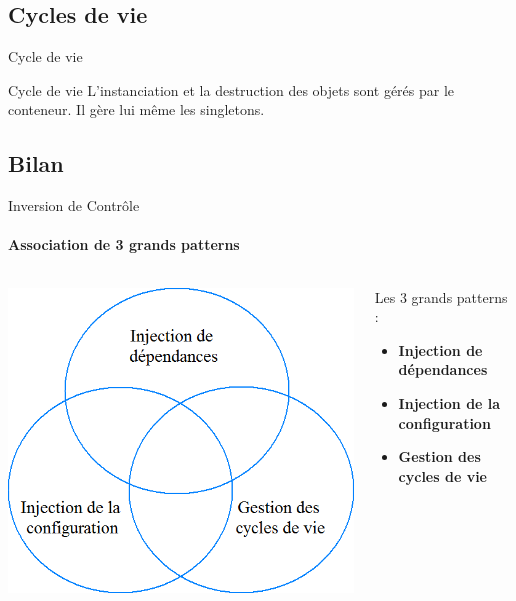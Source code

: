 \documentclass[compress]{beamer}%
\begin{document}
\subsection{Cycles de vie}

\begin{frame}{Cycle de vie}

	\begin{block}{Cycle de vie}
	L'instanciation et la destruction des objets sont gérés par le conteneur. Il gère lui même les singletons.
	\end{block}

\end{frame}

\subsection{Bilan}

\begin{frame}{Inversion de Contrôle}
	\framesubtitle{Association de 3 grands patterns}
	
	\begin{columns}
		\begin{column}{0.5\textwidth}
			\includegraphics[width=\textwidth]{images/spring_ioc.png}
		\end{column}
		\begin{column}{0.5\textwidth}
			Les 3 grands patterns :
			\begin{itemize}
			\item \textbf{Injection de dépendances}	
			\item \textbf{Injection de la configuration}
			\item \textbf{Gestion des cycles de vie}
			\end{itemize}
		\end{column}
	\end{columns}

\end{frame}
\end{document}
